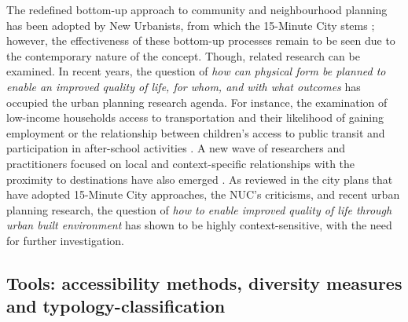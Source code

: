 \documentclass[
  authoryear,
  preprint,
  3p]{elsarticle}
\begin{document}
The redefined bottom-up approach to community and neighbourhood planning
has been adopted by New Urbanists, from which the 15-Minute City stems
\citep{kissfazekasCircleParadigms15minute2022}; however, the
effectiveness of these bottom-up processes remain to be seen due to the
contemporary nature of the concept. Though, related research can be
examined. In recent years, the question of \emph{how can physical form
be planned to enable an improved quality of life, for whom, and with
what outcomes} has occupied the urban planning research agenda. For
instance, the examination of low-income households access to
transportation and their likelihood of gaining employment
\citep{blumenbergDriveWorkRelationship2017, bastiaanssenDoesBetterJob2022}
or the relationship between children's access to public transit and
participation in after-school activities
\citep{palmRolePublicTransit2020}. A new wave of researchers and
practitioners focused on local and context-specific relationships with
the proximity to destinations have also emerged
\citep{silvaProximitycentredAccessibilityConceptual2023, silvaRegionalAccessibilityUndermining2022}.
As reviewed in the city plans that have adopted 15-Minute City
approaches, the NUC's criticisms, and recent urban planning research,
the question of \emph{how to enable improved quality of life through
urban built environment} has shown to be highly context-sensitive, with
the need for further investigation.

\subsection{Tools: accessibility methods, diversity measures and
typology-classification}\label{tools-accessibility-methods-diversity-measures-and-typology-classification}
\end{document}
